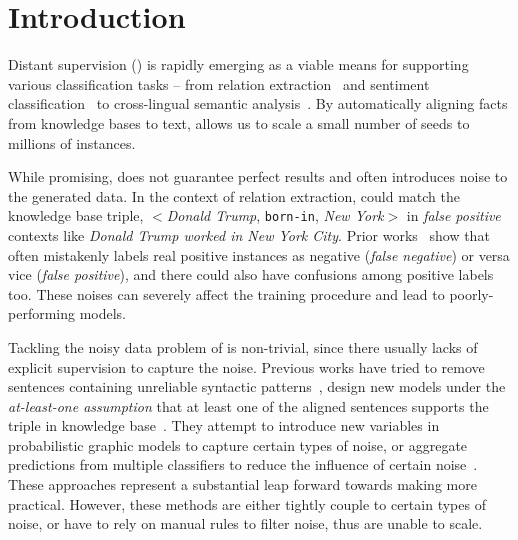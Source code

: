 \section{Introduction}

Distant supervision (\DS) is rapidly emerging as a viable means for supporting various classification tasks -- from relation extraction~\cite{mintz2009distant} and sentiment classification~\cite{go2009twitter} to cross-lingual semantic
analysis~\cite{fang2016learning}.
 By automatically aligning
facts from knowledge bases to text, \DS allows us to scale a small number of seeds to millions of instances.



While promising, \DS does not guarantee perfect results and often introduces noise to the
generated data. In the context of relation extraction, \DS could match the knowledge base triple, $<$\emph{Donald Trump},
\texttt{born-in}, \emph{New York}$>$  in \emph{false positive} contexts like \emph{Donald Trump worked in New York City}.
Prior works~\cite{takamatsu2012reducing,ritter2013modeling} show that \DS often mistakenly labels real positive instances as negative (\emph{false negative}) or
versa vice (\emph{false positive}), and there could also have confusions among positive labels too. These noises can
severely affect the training
procedure and lead to poorly-performing models.

Tackling the noisy data problem of \DS is non-trivial, since there usually lacks of explicit supervision to capture the noise.
Previous works have tried to remove sentences containing unreliable syntactic patterns~\cite{takamatsu2012reducing}, design new models under the
\textit{at-least-one assumption}
that at least one of the aligned sentences supports the triple in knowledge base~\cite{riedel2010modeling}. They attempt to introduce new variables in probabilistic graphic models to capture certain types of noise, or aggregate predictions from multiple classifiers to reduce the influence of certain noise~\cite{hoffmann2011knowledge,surdeanu2012multi,ritter2013modeling,min2013distant}. These approaches represent a substantial leap forward towards making \DS more practical. However, these methods are either tightly couple to certain types of noise,
or have to rely on manual rules to filter noise, thus are unable to scale.



